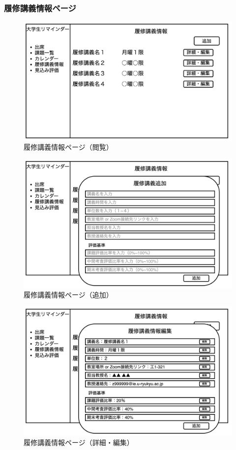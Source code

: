 \documentclass[a4paper, 11pt, titlepage]{jsarticle}
\begin{document}
\subsubsection{履修講義情報ページ}
\begin{figure}[htbp]
\begin{center}
\includegraphics[width=120mm]{../img/Lecture1.png}
\caption{履修講義情報ページ（閲覧）}
\end{center}
\end{figure}
\begin{figure}[htbp]
\begin{center}
\includegraphics[width=120mm]{../img/Lecture2.png}
\caption{履修講義情報ページ（追加）}
\end{center}
\end{figure}
\begin{figure}[htbp]
\begin{center}
\includegraphics[width=120mm]{../img/Lecture3.png}
\caption{履修講義情報ページ（詳細・編集）}
\end{center}
\end{figure}
\end{document}
